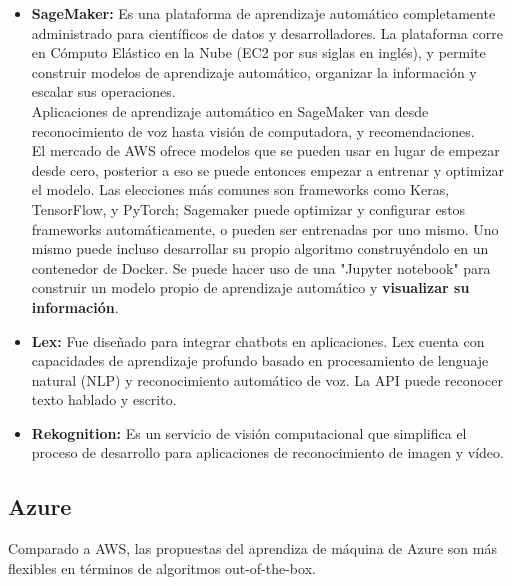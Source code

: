 \documentclass[12pt, a4paper, titlepage]{report}
\begin{document}
		\begin{itemize}
			\item \textbf{SageMaker:} Es una plataforma de aprendizaje automático completamente administrado para científicos de datos y desarrolladores. La plataforma corre en Cómputo Elástico en la  Nube (EC2 por sus siglas en inglés), y permite construir modelos de aprendizaje automático, organizar la información y escalar sus operaciones. \\
			Aplicaciones de aprendizaje automático en SageMaker van desde reconocimiento de voz hasta visión de computadora, y recomendaciones.\\ 
			El mercado de AWS ofrece modelos que se pueden usar en lugar de empezar desde cero, posterior a eso se puede entonces empezar a entrenar y optimizar el modelo. Las elecciones más comunes son frameworks como Keras, TensorFlow, y PyTorch; Sagemaker puede optimizar y configurar estos frameworks automáticamente, o pueden ser entrenadas por uno mismo. Uno mismo puede incluso desarrollar su propio algoritmo construyéndolo en un contenedor de Docker. Se puede hacer uso de una "Jupyter notebook" para construir un modelo propio de aprendizaje automático y \textbf{visualizar su información}.
			
			\item \textbf{Lex:} Fue diseñado para integrar chatbots en aplicaciones. Lex cuenta con capacidades de aprendizaje profundo basado en procesamiento de lenguaje natural (NLP) y reconocimiento automático de voz. La API puede reconocer texto hablado y escrito. 
			\item \textbf{Rekognition:} Es un servicio de visión computacional que simplifica el proceso de desarrollo para aplicaciones de reconocimiento de imagen y vídeo.
		\end{itemize}
		
		\subsection{Azure}
		Comparado a AWS, las propuestas del aprendiza de máquina de Azure son más flexibles en términos de algoritmos out-of-the-box.
		
\end{document}
